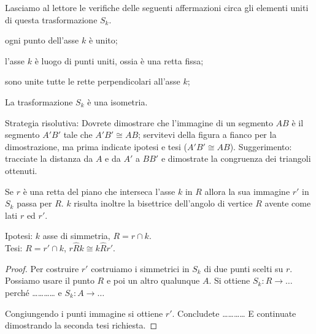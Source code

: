 

Lasciamo al lettore le verifiche delle seguenti affermazioni circa 
gli elementi uniti di questa trasformazione \(S_k\).
\begin{itemize*}
\item ogni punto dell'asse \(k\) è unito;
\item l'asse \(k\) è luogo di punti uniti, ossia è una retta fissa;
\item sono unite tutte le rette perpendicolari all'asse \(k\);
\end{itemize*}
\setlength{\intextsep}{\defintextsep}

\begin{teorema}\label{teo:8.3}
La trasformazione \(S_k\) è una isometria.
\end{teorema}

\noindent\begin{minipage}{0.65\textwidth}\parindent15pt
Strategia risolutiva:
Dovrete dimostrare che l'immagine di un segmento \(AB\) è il segmento 
\(A'B'\) tale che \(A'B'\cong AB\); servitevi della figura a fianco per 
la dimostrazione, ma prima indicate ipotesi e tesi (\(A'B'\cong AB\)).
Suggerimento: tracciate la distanza da \(A\) e da \(A'\) a \(BB'\) e 
dimostrate la congruenza dei triangoli ottenuti.
\end{minipage}\hfil
\begin{minipage}{0.35\textwidth}
  \centering
\end{minipage}\vspace{5pt}

\begin{teorema}\label{teo:8.4}
Se \(r\) è una retta del piano che interseca l'asse \(k\) in \(R\) allora 
la sua immagine \(r'\) in \(S_k\) passa per \(R\). \(k\) risulta inoltre la 
bisettrice dell'angolo di vertice \(R\) avente come lati \(r\) ed \(r'\).
\end{teorema}

\noindent\begin{minipage}{0.65\textwidth}\parindent15pt
\noindent Ipotesi: \(k\) asse di simmetria, \(R=r\cap k\).\\
Tesi: \(R=r'\cap k\), \(r\widehat{R}k\cong k\widehat{R}r'\).

\begin{proof}
Per costruire \(r'\) costruiamo i simmetrici in \(S_k\) di due punti 
scelti su \(r\). Possiamo usare il punto \(R\) e poi un altro qualunque 
\(A\). Si ottiene \(S_k: R \rightarrow \ldots{}\) perché 
\ldots\ldots\ldots\ldots{} e \(S_k: A \rightarrow \ldots{}\)

Congiungendo i punti immagine si ottiene \(r'\). Concludete 
\ldots\ldots\ldots\ldots{}
E continuate dimostrando la seconda tesi richiesta.
\end{proof}
\end{minipage}\hfil
\begin{minipage}{0.35\textwidth}
  \centering
\end{minipage}\vspace{5pt}

